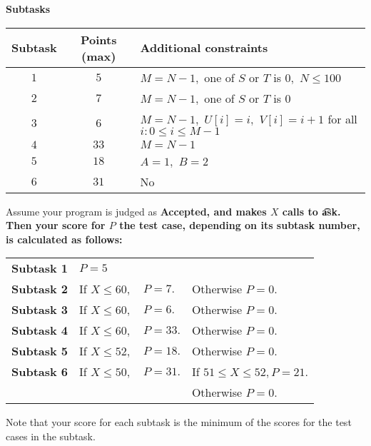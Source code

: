 \bf{Subtasks}

\begin{tabular}{|c|c|l|} \hline
\bf{Subtask}&\bf{Points (max)}&\bf{Additional constraints} \\\hline
$1$&$5$&$M=N-1,$ one of $S$ or $T$ is $0,$ $N \le 100$\\\hline
$2$&$7$&$M=N-1,$ one of $S$ or $T$ is $0$\\\hline
$3$&$6$&$M=N-1,$ $U[i] = i,$ $V[i] = i+1$ for all $i: 0\le i \le M-1$\\\hline
$4$&$33$&$M=N-1$\\\hline
$5$&$18$&$A=1,$ $B=2$\\\hline
$6$&$31$&No \\\hline
\end{tabular}

Assume your program is judged as \bf{Accepted}, and makes $X$ calls to \t{ask}. Then your score for $P$ the test case, depending on its subtask number, is calculated as follows:

\begin{tabular}{llll}
\bf{Subtask 1}&$P=5$&&\\
\bf{Subtask 2}&If $X \le 60,$ &$P=7.$&Otherwise $P=0.$ \\
\bf{Subtask 3}&If $X \le 60,$&$P=6.$&Otherwise $P=0.$ \\
\bf{Subtask 4}&If $X \le 60,$&$P=33.$&Otherwise $P=0.$ \\
\bf{Subtask 5}&If $X \le 52,$&$P=18.$&Otherwise $P=0.$ \\
\bf{Subtask 6}&If $X \le 50,$&$P=31.$&If $51\le X\le 52, P=21.$\\
&&& Otherwise  $P=0.$
\end{tabular}

Note that your score for each subtask is the minimum of the scores for the test cases in the subtask.
